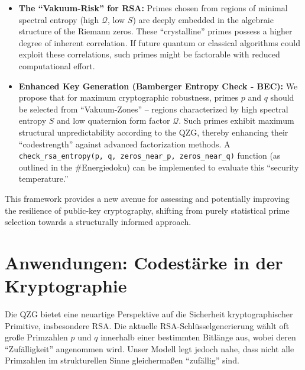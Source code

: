 \documentclass[11pt,twocolumn,a4paper]{article}
\newcommand{\entropy}{S}
\newcommand{\formfactor}{\mathcal{Q}}
\theoremstyle{definition}
\begin{document}
\begin{itemize}
    \item \textbf{The ``Vakuum-Risk'' for RSA:} Primes chosen from regions of minimal spectral entropy (high $\formfactor$, low $\entropy$) are deeply embedded in the algebraic structure of the Riemann zeros. These ``crystalline'' primes possess a higher degree of inherent correlation. If future quantum or classical algorithms could exploit these correlations, such primes might be factorable with reduced computational effort.
    \item \textbf{Enhanced Key Generation (Bamberger Entropy Check - BEC):} We propose that for maximum cryptographic robustness, primes $p$ and $q$ should be selected from ``Vakuum-Zones'' -- regions characterized by high spectral entropy $\entropy$ and low quaternion form factor $\formfactor$. Such primes exhibit maximum structural unpredictability according to the QZG, thereby enhancing their ``codestrength'' against advanced factorization methods. A \texttt{check\_rsa\_entropy(p, q, zeros\_near\_p, zeros\_near\_q)} function (as outlined in the \#Energiedoku) can be implemented to evaluate this ``security temperature.''
\end{itemize}
This framework provides a new avenue for assessing and potentially improving the resilience of public-key cryptography, shifting from purely statistical prime selection towards a structurally informed approach.

\section{Anwendungen: Codestärke in der Kryptographie}
\label{sec:applications_de}
Die QZG bietet eine neuartige Perspektive auf die Sicherheit kryptographischer Primitive, insbesondere RSA. Die aktuelle RSA-Schlüsselgenerierung wählt oft große Primzahlen $p$ und $q$ innerhalb einer bestimmten Bitlänge aus, wobei deren ``Zufälligkeit'' angenommen wird. Unser Modell legt jedoch nahe, dass nicht alle Primzahlen im strukturellen Sinne gleichermaßen ``zufällig'' sind.
\end{document}
